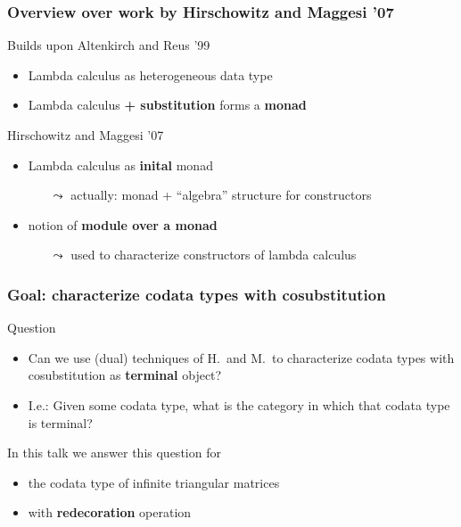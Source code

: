\documentclass[
serif,
mathsans,
]
{beamer}
\newcommand{\fat}[1]{\textbf{#1}}
\begin{document}
\begin{frame}
 \frametitle{Overview over work by Hirschowitz and Maggesi '07}
 \begin{block}{Builds upon Altenkirch and Reus '99}
  \begin{itemize}
   \item Lambda calculus as heterogeneous data type
   \item Lambda calculus \fat{+ substitution} forms a \fat{monad}
  \end{itemize}
 \end{block}

\begin{block}{Hirschowitz and Maggesi '07}
 \begin{itemize}
  \item Lambda calculus as \fat{inital} monad 
     \begin{itemize}
       \item [$\leadsto$]actually: monad + \enquote{algebra} structure for constructors
     \end{itemize}
  \item notion of \fat{module over a monad} 
     \begin{itemize}
        \item [$\leadsto$]used to characterize constructors of lambda calculus
     \end{itemize}
 \end{itemize}
\end{block}
\end{frame}


\begin{frame}
 \frametitle{Goal: characterize \fat{co}data types with \fat{co}substitution}
 
\begin{block}{Question}
  \begin{itemize}
    \item 
        Can we use (dual) techniques of H.\ and M.\ to characterize codata types with cosubstitution as
        \fat{terminal} object?
    \item I.e.: Given some codata type, what is the category in which that codata type is terminal?
  \end{itemize}
\end{block}
  
\begin{block}{In this talk}
 we answer this question for 
  \begin{itemize} 
    \item the codata type of infinite triangular matrices
    \item with \fat{redecoration} operation
  \end{itemize}
\end{block} 
\end{frame}
\end{document}
